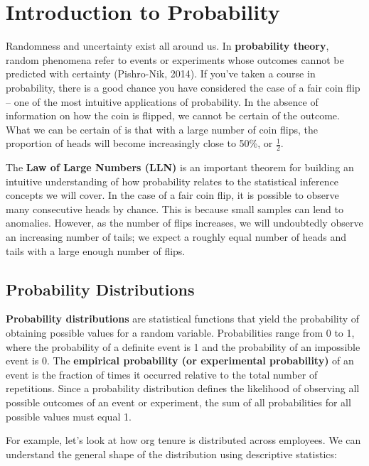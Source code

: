 \documentclass[]{book}
\begin{document}
\hypertarget{introduction-to-probability}{%
\section{Introduction to Probability}\label{introduction-to-probability}}

Randomness and uncertainty exist all around us. In \textbf{probability theory}, random phenomena refer to events or experiments whose outcomes cannot be predicted with certainty (Pishro-Nik, 2014). If you've taken a course in probability, there is a good chance you have considered the case of a fair coin flip -- one of the most intuitive applications of probability. In the absence of information on how the coin is flipped, we cannot be certain of the outcome. What we can be certain of is that with a large number of coin flips, the proportion of heads will become increasingly close to 50\%, or \(\frac{1}{2}\).

The \textbf{Law of Large Numbers (LLN)} is an important theorem for building an intuitive understanding of how probability relates to the statistical inference concepts we will cover. In the case of a fair coin flip, it is possible to observe many consecutive heads by chance. This is because small samples can lend to anomalies. However, as the number of flips increases, we will undoubtedly observe an increasing number of tails; we expect a roughly equal number of heads and tails with a large enough number of flips.

\hypertarget{probability-distributions}{%
\subsection{Probability Distributions}\label{probability-distributions}}

\textbf{Probability distributions} are statistical functions that yield the probability of obtaining possible values for a random variable. Probabilities range from 0 to 1, where the probability of a definite event is 1 and the probability of an impossible event is 0. The \textbf{empirical probability (or experimental probability)} of an event is the fraction of times it occurred relative to the total number of repetitions. Since a probability distribution defines the likelihood of observing all possible outcomes of an event or experiment, the sum of all probabilities for all possible values must equal 1.

For example, let's look at how org tenure is distributed across employees. We can understand the general shape of the distribution using descriptive statistics:
\end{document}
